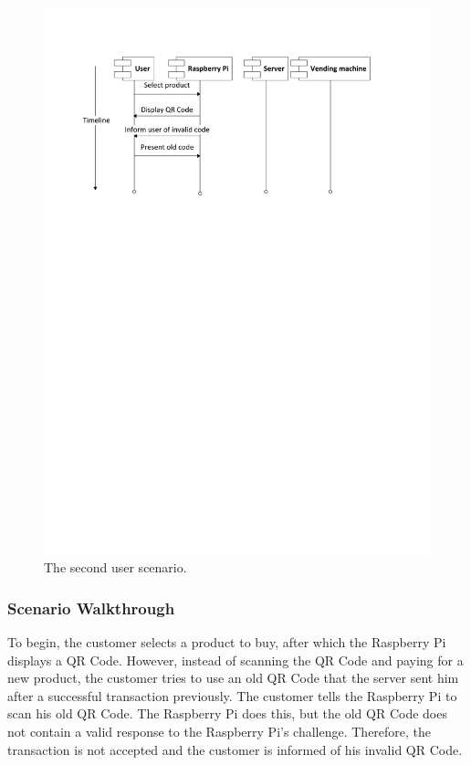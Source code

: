 \begin{figure}
 \centering 
 \includegraphics[clip=true, trim = 0 550 0 70,
 scale=0.7]{user_story_2}
 \caption{The second user scenario.}
 \label{fig:test2}
\end{figure}

\subsubsection{Scenario Walkthrough}

To begin, the customer selects a product to buy, after which the Raspberry Pi displays a
QR Code. However, instead of scanning the QR Code and paying for a new product, the
customer tries to use an old QR Code that the server sent him after a successful
transaction previously. The customer tells the Raspberry Pi to scan his old QR
Code. The Raspberry Pi does this, but the old QR Code does not contain a valid
response to the Raspberry Pi's challenge. Therefore, the transaction is not
accepted and the customer is informed of his invalid QR Code.

